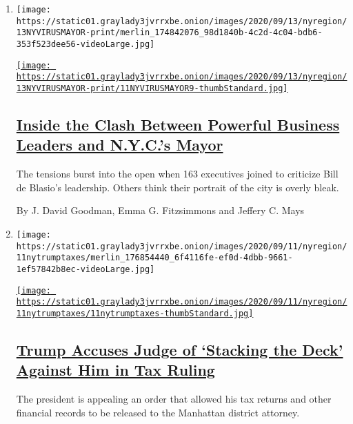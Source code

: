 \begin{enumerate}
\def\labelenumi{\arabic{enumi}.}
\item
  \texttt{[image: https://static01.graylady3jvrrxbe.onion/images/2020/09/13/nyregion/13NYVIRUSMAYOR-print/merlin\_174842076\_98d1840b-4c2d-4c04-bdb6-353f523dee56-videoLarge.jpg]}

  \href{/2020/09/12/nyregion/coronavirus-business-nyc-reopen.html}{\texttt{[image: https://static01.graylady3jvrrxbe.onion/images/2020/09/13/nyregion/13NYVIRUSMAYOR-print/11NYVIRUSMAYOR9-thumbStandard.jpg]}}

  \hypertarget{inside-the-clash-between-powerful-business-leaders-and-nycs-mayor}{%
  \subsection{\texorpdfstring{\href{/2020/09/12/nyregion/coronavirus-business-nyc-reopen.html}{Inside
  the Clash Between Powerful Business Leaders and N.Y.C.'s
  Mayor}}{Inside the Clash Between Powerful Business Leaders and N.Y.C.'s Mayor}}\label{inside-the-clash-between-powerful-business-leaders-and-nycs-mayor}}

  The tensions burst into the open when 163 executives joined to
  criticize Bill de Blasio's leadership. Others think their portrait of
  the city is overly bleak.

  By J. David Goodman, Emma G. Fitzsimmons and Jeffery C. Mays
\item
  \texttt{[image: https://static01.graylady3jvrrxbe.onion/images/2020/09/11/nyregion/11nytrumptaxes/merlin\_176854440\_6f4116fe-ef0d-4dbb-9661-1ef57842b8ec-videoLarge.jpg]}

  \href{/2020/09/11/nyregion/donald-trump-taxes-cyrus-vance.html}{\texttt{[image: https://static01.graylady3jvrrxbe.onion/images/2020/09/11/nyregion/11nytrumptaxes/11nytrumptaxes-thumbStandard.jpg]}}

  \hypertarget{trump-accuses-judge-of-stacking-the-deck-against-him-in-tax-ruling}{%
  \subsection{\texorpdfstring{\href{/2020/09/11/nyregion/donald-trump-taxes-cyrus-vance.html}{Trump
  Accuses Judge of `Stacking the Deck' Against Him in Tax
  Ruling}}{Trump Accuses Judge of `Stacking the Deck' Against Him in Tax Ruling}}\label{trump-accuses-judge-of-stacking-the-deck-against-him-in-tax-ruling}}

  The president is appealing an order that allowed his tax returns and
  other financial records to be released to the Manhattan district
  attorney.


\end{enumerate}
